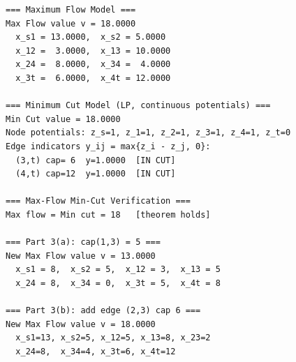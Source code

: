 \documentclass[12pt,a4paper]{article}
\begin{document}
\begin{verbatim}
=== Maximum Flow Model ===
Max Flow value v = 18.0000
  x_s1 = 13.0000,  x_s2 = 5.0000
  x_12 =  3.0000,  x_13 = 10.0000
  x_24 =  8.0000,  x_34 =  4.0000
  x_3t =  6.0000,  x_4t = 12.0000

=== Minimum Cut Model (LP, continuous potentials) ===
Min Cut value = 18.0000
Node potentials: z_s=1, z_1=1, z_2=1, z_3=1, z_4=1, z_t=0
Edge indicators y_ij = max{z_i - z_j, 0}:
  (3,t) cap= 6  y=1.0000  [IN CUT]
  (4,t) cap=12  y=1.0000  [IN CUT]

=== Max-Flow Min-Cut Verification ===
Max flow = Min cut = 18   [theorem holds]

=== Part 3(a): cap(1,3) = 5 ===
New Max Flow value v = 13.0000
  x_s1 = 8,  x_s2 = 5,  x_12 = 3,  x_13 = 5
  x_24 = 8,  x_34 = 0,  x_3t = 5,  x_4t = 8

=== Part 3(b): add edge (2,3) cap 6 ===
New Max Flow value v = 18.0000
  x_s1=13, x_s2=5, x_12=5, x_13=8, x_23=2
  x_24=8,  x_34=4, x_3t=6, x_4t=12
\end{verbatim}
\end{document}
